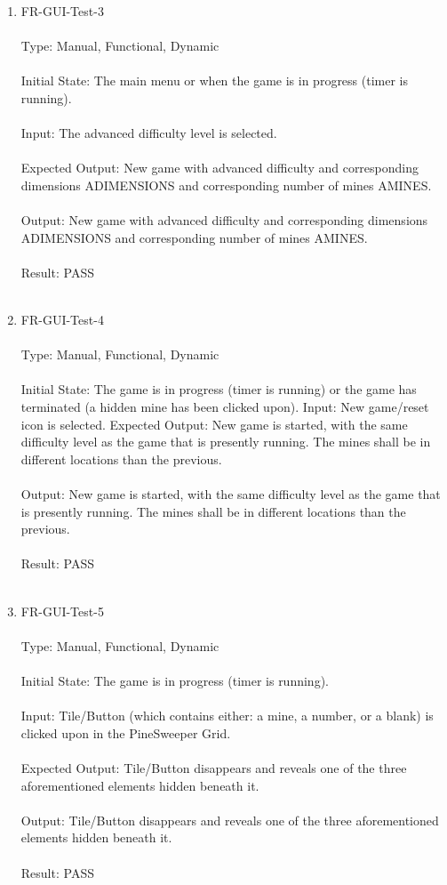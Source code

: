 \documentclass[12pt, titlepage]{article}
\begin{document}
\begin{enumerate}
\item{FR-GUI-Test-3\\\\}
Type: Manual, Functional, Dynamic\\\\				
Initial State: The main menu or when the game is in progress (timer is running).\\\\
Input: The advanced difficulty level is selected.\\\\			
Expected Output: New game with advanced difficulty and corresponding dimensions ADIMENSIONS and
corresponding number of mines AMINES.\\\\
Output: New game with advanced difficulty and corresponding dimensions ADIMENSIONS and
corresponding number of mines AMINES.\\\\
Result: PASS\\\\

\item{FR-GUI-Test-4\\\\}
Type: Manual, Functional, Dynamic\\\\				
Initial State: The game is in progress (timer is running) or the game has terminated (a hidden mine has been clicked upon).
Input: New game/reset icon is selected.					
Expected Output: New game is started, with the same difficulty level as the game that is presently running. The mines
shall be in different locations than the previous. \\\\
Output: New game is started, with the same difficulty level as the game that is presently running. The mines
shall be in different locations than the previous.\\\\
Result: PASS\\\\

\item{FR-GUI-Test-5\\\\}
Type: Manual, Functional, Dynamic\\\\
Initial State: The game is in progress (timer is running).\\\\
Input: Tile/Button (which contains either: a mine, a number, or a blank) is clicked upon in the PineSweeper Grid.\\\\
Expected Output: Tile/Button disappears and reveals one of the three aforementioned elements hidden beneath it.\\\\
Output: Tile/Button disappears and reveals one of the three aforementioned elements hidden beneath it.\\\\
Result: PASS\\\\


\end{enumerate}
\end{document}
